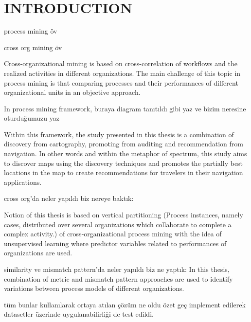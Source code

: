 \chapter{INTRODUCTION}
\label{chp:introduction}


process mining öv 

cross org mining öv

Cross-organizational mining is based on cross-correlation of workflows
and the realized activities in different organizations. The main challenge of this topic
in process mining is that comparing processes and their performances of different
organizational units in an objective approach.




In process mining framework, buraya diagram tanıtıldı gibi yaz ve bizim neresine oturduğumuzu yaz

Within this framework, the study presented in this thesis is a combination of discovery
from cartography, promoting from auditing and recommendation from navigation. In
other words and within the metaphor of spectrum, this study aims to discover maps
using the discovery techniques and promotes the partially best locations in the map to
create recommendations for travelers in their navigation applications.

cross org'da neler yapıldı biz nereye baktık:

Notion of this thesis is based on
vertical partitioning (Process instances, namely cases, distributed over several organizations
which collaborate to complete a complex activity.) of cross-organizational process mining with the idea of unsupervised
learning where predictor variables related to performances of organizations are
used.

similarity ve mismatch pattern'da neler yapıldı biz ne yaptık:
In this thesis, combination of metric and mismatch pattern approaches are used to identify variations between process models of different organizations.


tüm bunlar kullanılarak ortaya atılan çözüm ne oldu özet geç
implement edilerek datasetler üzerinde uygulanabilirliği de test edildi.

